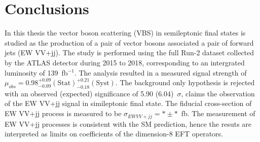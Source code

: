 \chapter{Conclusions}
\label{chap:conclusions}

In this thesis the vector boson scattering (VBS) in semileptonic final states is studied as the production of a pair of vector bosons associated a pair of forward jets (EW VV+jj). 
The study is performed using the full Run-2 dataset collected by the ATLAS detector during 2015 to 2018, corresponding to an intergrated luminosity of 139~fb$^{-1}$.
The analysis resulted in a measured signal strength of $\mu_{obs} = 0.98^{+ 0.09}_{- 0.09}(\mathrm{Stat})^{+ 0.21}_{- 0.18}(\mathrm{Syst})$.
The background only hypothesis is rejected with an observed (expected) significance of 5.90 (6.04)~$\sigma$, claims the observation of the EW VV+jj signal in simileptonic final state. 
The fiducial cross-section of EW VV+jj process is measured to be $\sigma_{EW VV+jj} = * \pm * $~fb.
The measurement of EW VV+jj processes is consistent with the SM prediction, hence the resuts are interpreted as limits on coefficients of the dimension-8 EFT operators.




